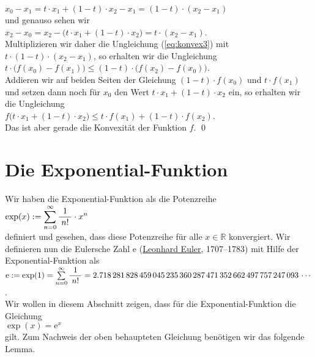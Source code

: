 \begin{enumerate}
  \hspace*{1.3cm}
  $x_0 - x_1 = t \cdot x_1 + (1 - t) \cdot x_2 - x_1 = (1-t) \cdot (x_2 - x_1)$
  \\[0.2cm]
  und genauso sehen wir
  \\[0.2cm]
  \hspace*{1.3cm}
  $x_2 - x_0 = x_2 - \bigl(t \cdot x_1 + (1 - t) \cdot x_2\bigr) = t \cdot (x_2 - x_1)$.
  \\[0.2cm]
  Multiplizieren wir daher die Ungleichung (\ref{eq:konvex3}) mit $t \cdot (1 - t) \cdot (x_2 -x_1)$, so
  erhalten wir die Ungleichung
  \\[0.2cm]
  \hspace*{1.3cm}
  $t \cdot \bigl(f(x_0) - f(x_1)\bigr) \leq (1 - t) \cdot \bigl(f(x_2) - f(x_0)\bigr)$.
  \\[0.2cm]
  Addieren wir auf beiden Seiten der Gleichung $(1 - t) \cdot f(x_0)$ und $t \cdot f(x_1)$
  und setzen dann noch f\"ur $x_0$ den Wert $t \cdot x_1 + (1-t)\cdot x_2$ ein, so erhalten wir
  die Ungleichung
  \\[0.2cm]
  \hspace*{1.3cm}
  $f\bigl(t \cdot x_1 + (1-t)\cdot x_2) \leq t \cdot f(x_1) + (1-t) \cdot f(x_2)$.
  \\[0.2cm]
  Das ist aber gerade die Konvexit\"at der Funktion $f$. \qed
\end{enumerate}


\section{Die Exponential-Funktion}
Wir haben die Exponential-Funktion als die Potenzreihe
\\[0.2cm]
\hspace*{1.3cm}
$\displaystyle\exp(x) := \sum\limits_{n=0}^\infty \displaystyle\frac{\;\displaystyle1\;}{\;\displaystyle n!\;} \cdot x^{n}$ 
\\[0.2cm]
definiert und gesehen, dass diese Potenzreihe f\"ur alle $x \in \mathbb{R}$ konvergiert.
Wir definieren nun die Eulersche Zahl $\mathrm{e}$ (\href{http://de.wikipedia.org/wiki/Leonhard_Euler}{Leonhard Euler},
1707--1783) mit Hilfe der Exponential-Funktion als
\\[0.2cm]
\hspace*{1.3cm}
$\mathrm{e} := \exp(1) = \sum\limits_{n=0}^\infty \displaystyle\frac{\;\displaystyle1\;}{\;\displaystyle n!\;} = 
  2.718\,281\,828\,459\,045\,235\,360\,287\,471\,352\,662\,497\,757\,247\,093\,\cdots
$.
\\[0.2cm]
Wir wollen in diesem Abschnitt zeigen, dass f\"ur die Exponential-Funktion die Gleichung 
\\[0.2cm]
\hspace*{1.3cm}
$\exp(x) = \mathrm{e}^x$ \quad 
\\[0.2cm]
gilt.  Zum Nachweis der oben behaupteten Gleichung ben\"otigen wir das folgende Lemma.

